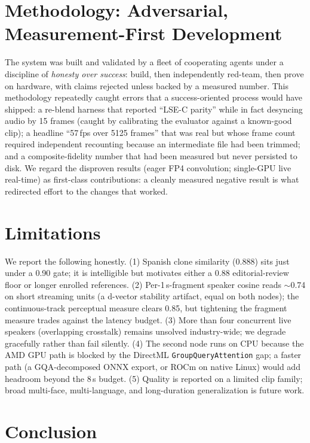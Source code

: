 \documentclass[11pt,a4paper]{article}
\begin{document}
\section{Methodology: Adversarial, Measurement-First Development}

The system was built and validated by a fleet of cooperating agents under a discipline of \emph{honesty over success}: build, then independently red-team, then prove on hardware, with claims rejected unless backed by a measured number. This methodology repeatedly caught errors that a success-oriented process would have shipped: a re-blend harness that reported ``LSE-C parity'' while in fact desyncing audio by 15 frames (caught by calibrating the evaluator against a known-good clip); a headline ``57\,fps over 5125 frames'' that was real but whose frame count required independent recounting because an intermediate file had been trimmed; and a composite-fidelity number that had been measured but never persisted to disk. We regard the disproven results (eager FP4 convolution; single-GPU live real-time) as first-class contributions: a cleanly measured negative result is what redirected effort to the changes that worked.

\section{Limitations}

We report the following honestly. (1) Spanish clone similarity (0.888) sits just under a 0.90 gate; it is intelligible but motivates either a 0.88 editorial-review floor or longer enrolled references. (2) Per-1\,s-fragment speaker cosine reads $\sim$0.74 on short streaming units (a d-vector stability artifact, equal on both nodes); the continuous-track perceptual measure clears 0.85, but tightening the fragment measure trades against the latency budget. (3) More than four concurrent live speakers (overlapping crosstalk) remains unsolved industry-wide; we degrade gracefully rather than fail silently. (4) The second node runs on CPU because the AMD GPU path is blocked by the DirectML \texttt{GroupQueryAttention} gap; a faster path (a GQA-decomposed ONNX export, or ROCm on native Linux) would add headroom beyond the 8\,s budget. (5) Quality is reported on a limited clip family; broad multi-face, multi-language, and long-duration generalization is future work.

\section{Conclusion}
\end{document}
